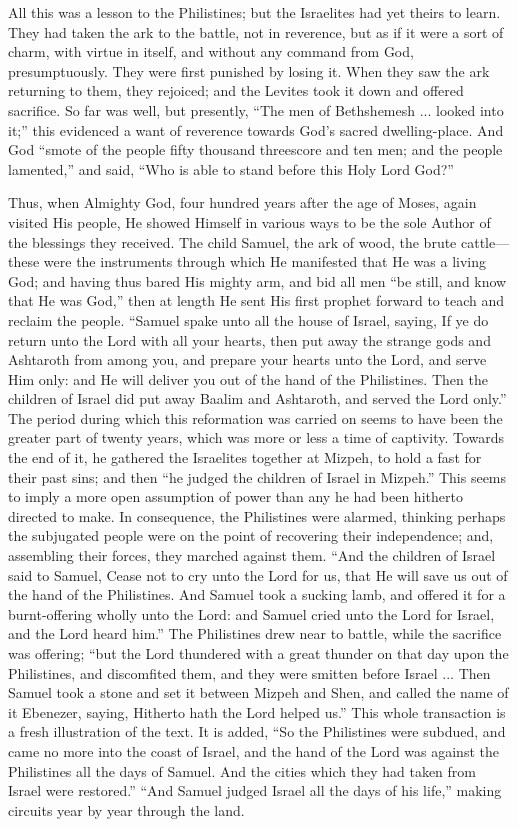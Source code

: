 All this was a lesson to the Philistines; but the Israelites had
yet theirs to learn. They had taken the ark to the battle, not in
reverence, but as if it were a sort of charm, with virtue in itself,
and without any command from God, presumptuously. They were first
punished by losing it. When they saw the ark returning to them, they
rejoiced; and the Levites took it down and offered sacrifice. So far
was well, but presently, ``The men of Bethshemesh ... looked into
it;'' this evidenced a want of reverence towards God's sacred
dwelling-place. And God ``smote of the people fifty thousand
threescore and ten men; and the people lamented,'' and said,
``Who is able to stand before this Holy Lord God?''

Thus, when Almighty God, four hundred years after the age of Moses,
again visited His people, He showed Himself in various ways to be the
sole Author of the blessings they received. The child Samuel, the ark
of wood, the brute cattle—these were the instruments through which
He manifested that He was a living God; and having thus bared His
mighty arm, and bid all men ``be still, and know that He was
God,'' then at length He sent His first prophet forward to teach
and reclaim the people. ``Samuel spake unto all the house of
Israel, saying, If ye do return unto the Lord with all your hearts,
then put away the strange gods and Ashtaroth from among you, and
prepare your hearts unto the Lord, and serve Him only: and He will
deliver you out of the hand of the Philistines. Then the children of
Israel did put away Baalim and Ashtaroth, and served the Lord
only.'' The period during which this reformation was carried on
seems to have been the greater part of twenty years, which was more or
less a time of captivity. Towards the end of it, he gathered the
Israelites together at Mizpeh, to hold a fast for their past sins; and
then ``he judged the children of Israel in Mizpeh.'' This
seems to imply a more open assumption of power than any he had been
hitherto directed to make. In consequence, the Philistines were
alarmed, thinking perhaps the subjugated people were on the point of
recovering their independence; and, assembling their forces, they
marched against them. ``And the children of Israel said to Samuel,
Cease not to cry unto the Lord for us, that He will save us out of the
hand of the Philistines. And Samuel took a sucking lamb, and offered
it for a burnt-offering wholly unto the Lord: and Samuel cried unto
the Lord for Israel, and the Lord heard him.'' The Philistines
drew near to battle, while the sacrifice was offering; ``but the
Lord thundered with a great thunder on that day upon the Philistines,
and discomfited them, and they were smitten before Israel ... Then
Samuel took a stone and set it between Mizpeh and Shen, and called the
name of it Ebenezer, saying, Hitherto hath the Lord helped us.''
This whole transaction is a fresh illustration of the text. It is
added, ``So the Philistines were subdued, and came no more into
the coast of Israel, and the hand of the Lord was against the
Philistines all the days of Samuel. And the cities which they had
taken from Israel were restored.'' ``And Samuel judged Israel
all the days of his life,'' making circuits year by year through
the land.

